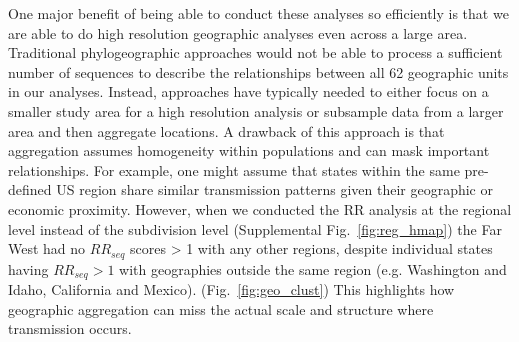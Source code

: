 \documentclass[11pt, letterpaper, oneside]{article}
\begin{document}
One major benefit of being able to conduct these analyses so efficiently is that we are able to do high resolution geographic analyses even across a large area.
Traditional phylogeographic approaches would not be able to process a sufficient number of sequences to describe the relationships between all 62 geographic units in our analyses.
Instead, approaches have typically needed to either focus on a smaller study area for a high resolution analysis or subsample data from a larger area and then aggregate locations.\autocite{mattesonGenomicSurveillanceReveals2023,dengGenomicSurveillanceReveals2020,lemeyUntanglingIntroductionsPersistence2021,tsuiGenomicAssessmentInvasion2023}
A drawback of this approach is that aggregation assumes homogeneity within populations and can mask important relationships.
For example, one might assume that states within the same pre-defined US region share similar transmission patterns given their geographic or economic proximity.
However, when we conducted the RR analysis at the regional level instead of the subdivision level (Supplemental Fig.\ \ref{fig:reg_hmap}) the Far West had no $RR_{seq}$ scores > 1 with any other regions, despite individual states having $RR_{seq} > 1$ with geographies outside the same region (e.g. Washington and Idaho, California and Mexico). (Fig.\ \ref{fig:geo_clust})
This highlights how geographic aggregation can miss the actual scale and structure where transmission occurs.
\end{document}
